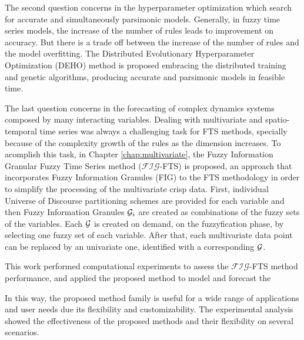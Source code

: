 The second question concerns in the hyperparameter optimization which search for accurate and simultaneously parsimonic models. Generally, in fuzzy time series models, the increase of the number of rules leads to improvement on accuracy. But there is a trade off between the increase of the number of rules and the model overfitting. The Distributed Evolutionary Hyperparameter Optimization (DEHO) method is proposed embracing the distributed training and genetic algorithms, producing accurate and parsimonic models in feasible time.

The last question concerns in the forecasting of complex dynamics systems composed by many interacting variables. Dealing with multivariate and spatio-temporal time series was always a challenging task for FTS methods, specially because of the complexity growth of the rules as the dimension increases. To acomplish this task, in Chapter \ref{chap:multivariate}, the Fuzzy Information Granular Fuzzy Time Series method ($\mathcal{FIG}$-FTS) is proposed, an approach that incorporates Fuzzy Information Granules (FIG) to the FTS methodology in order to simplify the processing of the multivariate crisp data. First, individual Universe of Discourse partitioning schemes are provided for each variable and then Fuzzy Information Granules $\mathcal{G}_i$ are created as combinations of the fuzzy sets of the variables. Each $\mathcal{G}$ is created on demand, on the fuzzyfication phase, by selecting one fuzzy set of each variable. After that, each multivariate data point can be replaced by an univariate one, identified with a corresponding $\mathcal{G}$.

This work performed computational experiments to assess the $\mathcal{FIG}$-FTS method performance, and applied the proposed method to model and forecast the

In this way, the proposed method family is useful for a wide range of applications and user needs due its flexibility and customizability. The experimental analysis showed the effectiveness of the proposed methods and their flexibility on several scenarios. 

